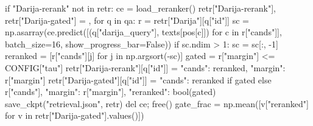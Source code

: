 if "Darija-rerank" not in retr:
    ce = load_reranker()
    retr["Darija-rerank"], retr["Darija-gated"] = {}, {}
    for q in qa:
        r = retr["Darija"][q["id"]]
        sc = np.asarray(ce.predict([(q["darija_query"], texts[pos[c]]) for c in r["cands"]],
                                   batch_size=16, show_progress_bar=False))
        if sc.ndim > 1:
            sc = sc[:, -1]
        reranked = [r["cands"][j] for j in np.argsort(-sc)]
        gated = r["margin"] <= CONFIG["tau"]
        retr["Darija-rerank"][q["id"]] = {"cands": reranked, "margin": r["margin"]}
        retr["Darija-gated"][q["id"]] = {"cands": reranked if gated else r["cands"],
                                         "margin": r["margin"], "reranked": bool(gated)}
    save_ckpt("retrieval.json", retr)
    del ce; free()
gate_frac = np.mean([v["reranked"] for v in retr["Darija-gated"].values()])

